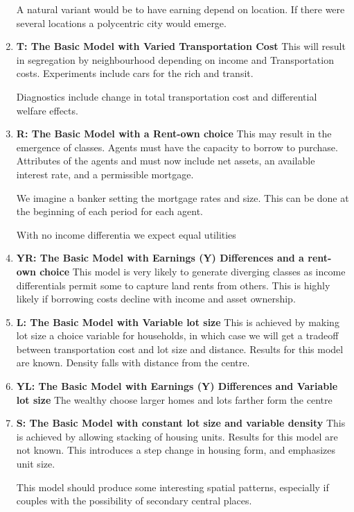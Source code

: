 \begin{enumerate}
A natural variant would be to have earning depend on location. If there were several locations  a polycentric city would emerge.

\item \textbf{T: The Basic Model with Varied Transportation Cost }
This will result in segregation by neighbourhood depending on income and Transportation costs. Experiments include cars for the rich and  transit. 

Diagnostics include change in total transportation cost and differential welfare effects.


\item \textbf{R: The Basic Model with a Rent-own choice}
This may result in the emergence of classes. Agents must have the capacity to borrow to purchase. Attributes of the agents and must now include  net assets,  an available interest rate, and a permissible mortgage.

We imagine a banker setting the mortgage rates and size. This can be done at the beginning of each period for each agent. 

With no income differentia we expect equal utilities

\item \textbf{YR: The Basic Model with Earnings (Y) Differences and a rent-own choice}
This model is very likely to generate diverging classes as income differentials permit some to capture land rents from others. This is highly likely if borrowing costs decline with income and asset ownership.

\item \textbf{L: The Basic Model with Variable lot size}
This is achieved by making lot size a choice variable for households, in which case we will get a tradeoff between transportation cost and lot size and distance. Results for this model are known. Density  falls with distance from the centre. 

\item \textbf{YL: The Basic Model with Earnings (Y) Differences and Variable lot size}
The wealthy choose larger homes and lots farther form the centre

\item \textbf{S: The Basic Model with constant lot size and variable density}
This is achieved by allowing stacking of housing units. Results for this model are not known. This introduces a step change in housing form, and emphasizes unit size.

This model should produce some interesting spatial patterns, especially if couples with the possibility of secondary central places.


\end{enumerate}
